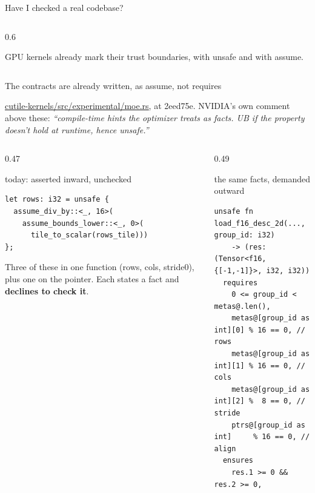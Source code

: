 \documentclass[aspectratio=169,10pt]{beamer}
\newcommand{\code}[1]{{\ttfamily #1}}
\begin{document}
\begin{frame}{Have I checked a real codebase?}
\begin{columns}[T]
\begin{column}{0.6\textwidth}
\vspace{5pt}
\begin{callout}[lgAccent]
\scriptsize
GPU kernels already mark their trust boundaries, with \code{unsafe} and with \code{assume}.
\end{callout}
\end{column}
\end{columns}

\end{frame}

\begin{frame}[fragile]{The contracts are already written, as \code{assume}, not \code{requires}}

{\scriptsize
\href{https://github.com/NVlabs/cutile-rs/blob/2eed75e8f552be31216ddf2019288f03dfec4939/cutile-kernels/src/experimental/moe.rs}{\color{lgTeal}\underline{\code{cutile-kernels/src/experimental/moe.rs}}},
at \code{2eed75e}. NVIDIA's own comment above these: \emph{``compile-time hints the
optimizer treats as facts. UB if the property doesn't hold at runtime, hence \code{unsafe}.''}
}

\vspace{5pt}
\begin{columns}[T]
\begin{column}{0.47\textwidth}
\begin{codebox}[lgRed]{today: asserted inward, unchecked}
\begin{lstlisting}[basicstyle=\ttfamily\tiny\color{lgInk}]
let rows: i32 = unsafe {
  assume_div_by::<_, 16>(
    assume_bounds_lower::<_, 0>(
      tile_to_scalar(rows_tile)))
};
\end{lstlisting}
\end{codebox}

\vspace{3pt}
{\scriptsize
Three of these in one function (\code{rows}, \code{cols}, \code{stride0}), plus one on
the pointer. Each states a fact and \textbf{declines to check it}.
}
\end{column}

\begin{column}{0.49\textwidth}
\begin{codebox}[lgGreen]{the same facts, demanded outward}
\begin{lstlisting}[basicstyle=\ttfamily\tiny\color{lgInk}]
unsafe fn load_f16_desc_2d(..., group_id: i32)
    -> (res: (Tensor<f16,{[-1,-1]}>, i32, i32))
  requires
    0 <= group_id < metas@.len(),
    metas@[group_id as int][0] % 16 == 0, // rows
    metas@[group_id as int][1] % 16 == 0, // cols
    metas@[group_id as int][2] %  8 == 0, // stride
    ptrs@[group_id as int]     % 16 == 0, // align
  ensures
    res.1 >= 0 && res.2 >= 0,
\end{lstlisting}
\end{codebox}
\end{column}
\end{columns}


\end{frame}
\end{document}
